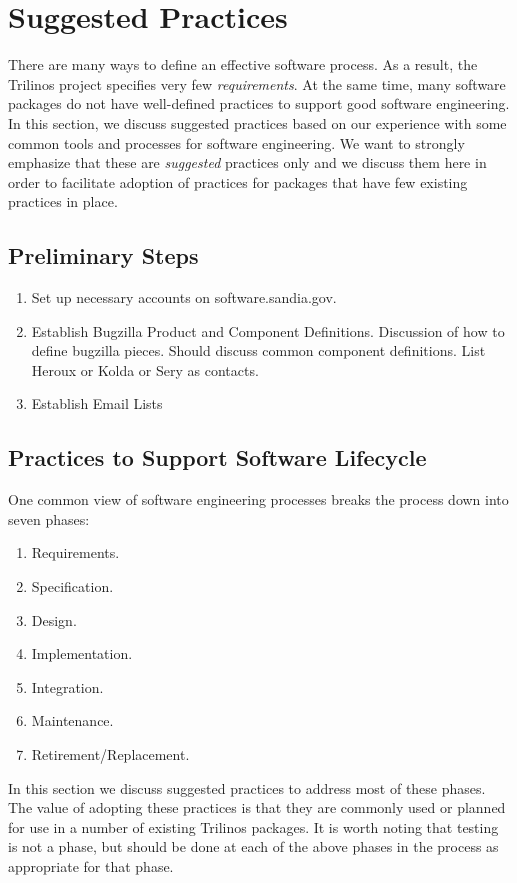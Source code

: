 \documentclass[12pt,relax]{TrilinosDevGuide}
\begin{document}
\section{Suggested Practices}
\label{Section:SuggestPractices}

There are many ways to define an effective software process.  As a result, the 
Trilinos project specifies very few {\it requirements}.  At the same time, 
many software packages do not have well-defined practices to support good 
software engineering.  In this section, we discuss suggested practices based 
on our experience with some common tools and processes for software 
engineering.  We want to strongly emphasize that these are {\it suggested} 
practices only and we discuss them here in order to facilitate adoption of 
practices for packages that have few existing practices in place.

\subsection{Preliminary Steps}

\begin{enumerate}
\item Set up necessary accounts on software.sandia.gov.
\item Establish Bugzilla Product and Component Definitions.
Discussion of how to define bugzilla pieces.  Should discuss common component 
definitions.  List Heroux or Kolda or Sery as contacts.
\item Establish Email Lists
\end{enumerate}

\subsection{Practices to Support Software Lifecycle}

One common view of software engineering processes breaks the process down into 
seven phases:
\begin{enumerate}
\item Requirements.
\item Specification.
\item Design.
\item Implementation.
\item Integration.
\item Maintenance.
\item Retirement/Replacement.
\end{enumerate}
In this section we discuss suggested practices to address most of these 
phases.  The value of adopting these practices is that they are commonly used 
or planned for use in a number of existing Trilinos packages.  It is worth 
noting that testing is not a phase, but should be done at each of the above 
phases in the process as appropriate for that phase.
\end{document}
